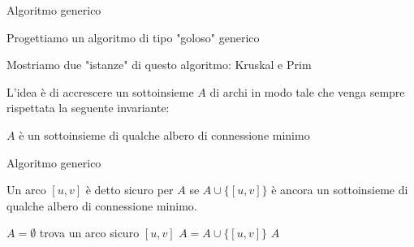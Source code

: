 \begin{frame}{Algoritmo generico}

\vspace{-9pt}
\begin{myboxtitle}
\BI
\item Progettiamo un algoritmo di tipo "goloso" generico
\item Mostriamo due "istanze" di questo algoritmo: \alert{Kruskal} e \alert{Prim}
\EI
\end{myboxtitle}

\begin{myboxtitle}[Approccio]
L'idea è di accrescere un sottoinsieme $A$ di archi in modo tale che venga sempre
rispettata la seguente invariante:
\BI
\item $A$ è un sottoinsieme di qualche albero di connessione minimo
\EI
\end{myboxtitle}

\end{frame}

\begin{frame}{Algoritmo generico}

\vspace{-9pt}
\begin{myboxtitle}
Un arco $[u,v]$ è detto \alert{sicuro per $A$} se $A \cup \{[u,v]\}$ è ancora un sottoinsieme di qualche albero di connessione minimo.
\end{myboxtitle}

\medskip
\begin{Procedure}
\caption[A]{\Set\ (\Graph $G$, $\INTEGER[\,]\ w$)}

  \Set $A = \emptyset$\;
  {
     trova un arco sicuro $[u,v]$\;
     $A = A \cup \{[u,v]\}$\;
  } 
  \Return $A$\;  

\end{Procedure}

\end{frame}


